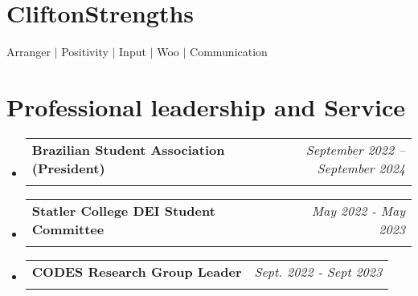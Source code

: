 \documentclass[letterpaper,11pt]{article}
\makeatletter
\newcommand{\resumeOrganizationHeading}[4]{
  \vspace{1pt}\item
    \begin{tabular*}{0.97\textwidth}[t]{l@{\extracolsep{\fill}}r}
      \textbf{#1} & \textit{\small #2} \\
      \textit{\small#3}
    \end{tabular*}\vspace{-20pt}
}
\newcommand{\resumeSubHeadingListStart}{\begin{itemize}[leftmargin=0.15in, label={}]}
\newcommand{\resumeSubHeadingListEnd}{\end{itemize}}
\makeatother
\begin{document}
\section{CliftonStrengths}
\vspace{2pt}
\resumeSubHeadingListStart
  \small{\item{
      Arranger $|$ Positivity $|$ Input $|$ Woo $|$ Communication
  }}
\resumeSubHeadingListEnd

    
    




 \section{Professional leadership and Service}
   \resumeSubHeadingListStart
    
     \resumeOrganizationHeading{Brazilian Student Association (President)}{September 2022 -- September 2024}{}{}
     \resumeOrganizationHeading{Statler College DEI Student Committee}{May 2022 - May 2023}{}{}
     \resumeOrganizationHeading{CODES Research Group Leader}{Sept. 2022 - Sept 2023}{}{}
   \resumeSubHeadingListEnd


\end{document}
